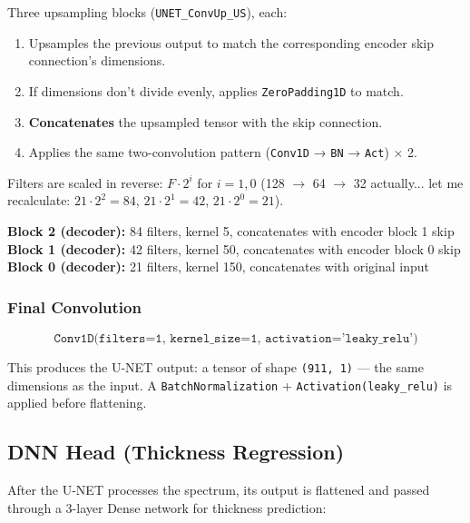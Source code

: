 \documentclass[11pt,a4paper]{article}
\begin{document}
Three upsampling blocks ({\tt UNET\_ConvUp\_US}), each:

\begin{enumerate}
    \item Upsamples the previous output to match the corresponding encoder skip connection's dimensions.
    \item If dimensions don't divide evenly, applies \texttt{ZeroPadding1D} to match.
    \item \textbf{Concatenates} the upsampled tensor with the skip connection.
    \item Applies the same two-convolution pattern ({\tt Conv1D} → {\tt BN} → {\tt Act}) × 2.
\end{enumerate}

Filters are scaled in reverse: $F \cdot 2^i$ for $i = 1, 0$ (128 $\rightarrow$ 64 $\rightarrow$ 32 actually... let me recalculate: $21 \cdot 2^2 = 84$, $21 \cdot 2^1 = 42$, $21 \cdot 2^0 = 21$).

\textbf{Block 2 (decoder):} 84 filters, kernel 5, concatenates with encoder block 1 skip \\
\textbf{Block 1 (decoder):} 42 filters, kernel 50, concatenates with encoder block 0 skip \\
\textbf{Block 0 (decoder):} 21 filters, kernel 150, concatenates with original input

\subsubsection*{Final Convolution}

\begin{equation*}
    \texttt{Conv1D(filters=1, kernel\_size=1, activation='leaky\_relu')}
\end{equation*}

This produces the U-NET output: a tensor of shape \texttt{(911, 1)} — the same dimensions as the input. A {\tt BatchNormalization} + {\tt Activation(leaky\_relu)} is applied before flattening.

\subsection{DNN Head (Thickness Regression)}

After the U-NET processes the spectrum, its output is flattened and passed through a 3-layer Dense network for thickness prediction:
\end{document}
